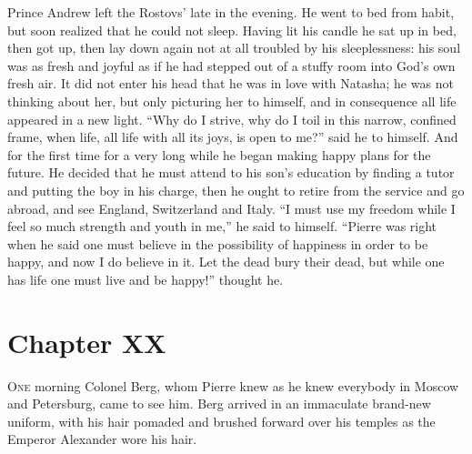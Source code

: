 Prince Andrew left the Rostovs' late in the evening. He went to
bed from habit, but soon realized that he could not sleep. Having
lit his candle he sat up in bed, then got up, then lay down again
not at all troubled by his sleeplessness: his soul was as fresh
and joyful as if he had stepped out of a stuffy room into God's
own fresh air. It did not enter his head that he was in love with
Natasha; he was not thinking about her, but only picturing her to
himself, and in consequence all life appeared in a new
light. ``Why do I strive, why do I toil in this narrow, confined
frame, when life, all life with all its joys, is open to me?''
said he to himself. And for the first time for a very long while
he began making happy plans for the future. He decided that he
must attend to his son's education by finding a tutor and putting
the boy in his charge, then he ought to retire from the service
and go abroad, and see England, Switzerland and Italy. ``I must
use my freedom while I feel so much strength and youth in me,''
he said to himself. ``Pierre was right when he said one must
believe in the possibility of happiness in order to be happy, and
now I do believe in it. Let the dead bury their dead, but while
one has life one must live and be happy!'' thought he.


\chapter*{Chapter XX}
\ifaudio     
{} 
\fi

\lettrine[lines=2, loversize=0.3, lraise=0]{\initfamily O}{ne}
morning Colonel Berg, whom Pierre knew as he knew everybody
in Moscow and Petersburg, came to see him. Berg arrived in an
immaculate brand-new uniform, with his hair pomaded and brushed
forward over his temples as the Emperor Alexander wore his hair.

